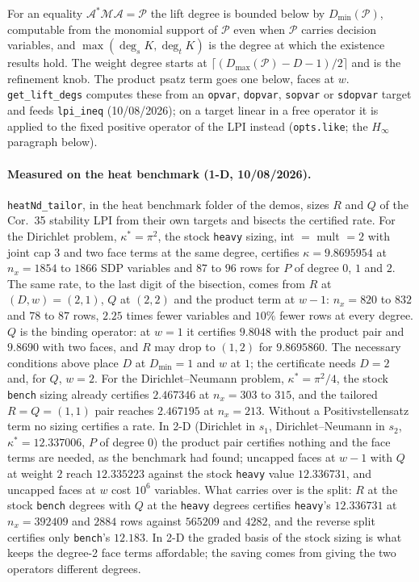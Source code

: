 \documentclass[12pt]{article}
\newcommand{\mcl}[1]{\mathcal{#1}}
\newcommand{\code}[1]{\texttt{#1}}
\theoremstyle{plain}
\theoremstyle{definition}
\theoremstyle{remark}
\begin{document}
For an equality $\mcl A^*\mcl M\mcl A=\mcl P$ the lift degree is bounded below by $D_{\min}(\mcl P)$, computable from the monomial support of $\mcl P$ even when $\mcl P$ carries decision variables, and $\max(\deg_sK,\deg_tK)$ is the degree at which the existence results hold. The weight degree starts at $\lceil(D_{\max}(\mcl P)-D-1)/2\rceil$ and is the refinement knob. The product psatz term goes one below, faces at $w$. \code{get\_lift\_degs} computes these from an \code{opvar}, \code{dopvar}, \code{sopvar} or \code{sdopvar} target and feeds \code{lpi\_ineq} (10/08/2026); on a target linear in a free operator it is applied to the fixed positive operator of the LPI instead (\code{opts.like}; the $H_\infty$ paragraph below).

\paragraph{Measured on the heat benchmark (1-D, 10/08/2026).} \code{heatNd\_tailor}, in the heat benchmark folder of the demos, sizes $R$ and $Q$ of the Cor.~35 stability LPI from their own targets and bisects the certified rate. For the Dirichlet problem, $\kappa^*=\pi^2$, the stock \code{heavy} sizing, int $=$ mult $=2$ with joint cap $3$ and two face terms at the same degree, certifies $\kappa=9.8695954$ at $n_x=1854$ to $1866$ SDP variables and $87$ to $96$ rows for $P$ of degree $0$, $1$ and $2$. The same rate, to the last digit of the bisection, comes from $R$ at $(D,w)=(2,1)$, $Q$ at $(2,2)$ and the product term at $w-1$: $n_x=820$ to $832$ and $78$ to $87$ rows, $2.25$ times fewer variables and $10\%$ fewer rows at every degree. $Q$ is the binding operator: at $w=1$ it certifies $9.8048$ with the product pair and $9.8690$ with two faces, and $R$ may drop to $(1,2)$ for $9.8695860$. The necessary conditions above place $D$ at $D_{\min}=1$ and $w$ at $1$; the certificate needs $D=2$ and, for $Q$, $w=2$. For the Dirichlet--Neumann problem, $\kappa^*=\pi^2/4$, the stock \code{bench} sizing already certifies $2.467346$ at $n_x=303$ to $315$, and the tailored $R=Q=(1,1)$ pair reaches $2.467195$ at $n_x=213$. Without a Positivstellensatz term no sizing certifies a rate. In 2-D (Dirichlet in $s_1$, Dirichlet--Neumann in $s_2$, $\kappa^*=12.337006$, $P$ of degree $0$) the product pair certifies nothing and the face terms are needed, as the benchmark had found; uncapped faces at $w-1$ with $Q$ at weight $2$ reach $12.335223$ against the stock \code{heavy} value $12.336731$, and uncapped faces at $w$ cost $10^6$ variables. What carries over is the split: $R$ at the stock \code{bench} degrees with $Q$ at the \code{heavy} degrees certifies \code{heavy}'s $12.336731$ at $n_x=392409$ and $2884$ rows against $565209$ and $4282$, and the reverse split certifies only \code{bench}'s $12.183$. In 2-D the graded basis of the stock sizing is what keeps the degree-2 face terms affordable; the saving comes from giving the two operators different degrees.
\end{document}
